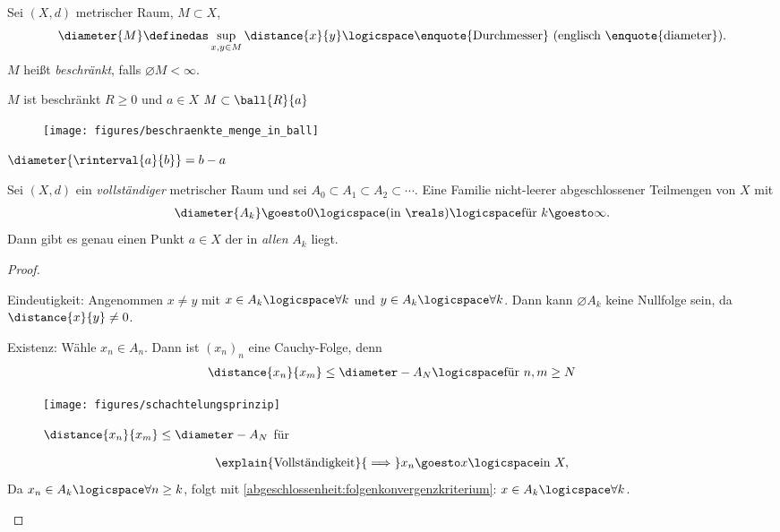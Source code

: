 \begin{definition}
    Sei \( (X,d)\) metrischer Raum, \( M\subset X\),
    \begin{align*}
        \diameter{M}\definedas \sup_{x,y\in M}\distance{x}{y}\logicspace \text{\enquote{Durchmesser} (englisch \enquote{diameter})}.
    \end{align*}
    \( M \) heißt \emph{beschränkt}, falls \( \diameter{M}<\infty \).
\end{definition}
\begin{bemerkung*}
    \( M\) ist beschränkt \tiff \texists \( R\geq 0\)  und \( a\in X\) \sd \( M\subset \ball{R}{a}\) 
    \begin{figure}[H]
        \centering
        \texttt{[image: figures/beschraenkte\_menge\_in\_ball]}
        \label{fig:beschraenkte_menge_in_ball}
    \end{figure}   
\end{bemerkung*}
\begin{beispiel*}
    \( \diameter{\rinterval{a}{b}}=b-a\)
\end{beispiel*}
\begin{satz}[Schachtelungsprinzip]
    Sei \( (X,d)\) ein \emph{vollständiger} metrischer Raum und sei \( A_0\subset A_1\subset A_2\subset \cdots\).
    Eine Familie nicht-leerer abgeschlossener Teilmengen von \( X\) mit
    \begin{align*}
        \diameter{A_k}\goesto 0 \logicspace (\text{in }\reals)\logicspace \text{für } k\goesto \infty. 
    \end{align*} 
    Dann gibt es genau einen Punkt \( a\in X\) der in \emph{allen} \( A_k\) liegt.
\end{satz}
\begin{proof}
    \begin{proofdescription}
        \item[Eindeutigkeit:] Angenommen \texists \( x\neq y\)  mit \( x\in A_k \logicspace \forall k\)  und \( y\in A_k \logicspace \forall k\). Dann kann \( \diameter{A_k}\) keine Nullfolge sein, da \( \distance{x}{y}\neq 0\).
        \item[Existenz:] Wähle \( x_n\in A_n\). Dann ist \( (x_n)_n\)  eine Cauchy-Folge, denn
        \begin{align*}
            \distance{x_n}{x_m}\leq \diameter-{A_N} \logicspace \text{für }n,m\geq N 
        \end{align*} 
        \begin{figure}[H]
            \centering
            \texttt{[image: figures/schachtelungsprinzip]}
            \caption*{\( \distance{x_n}{x_m}\leq \diameter-{A_N}\) für \( \)    }
            \label{fig:schachtelungsprinzip}
        \end{figure}
        \begin{align*}
            \explain{\text{Vollständigkeit}}{\implies}x_n \goesto x \logicspace \text{in } X,
        \end{align*}
        Da \( x_n\in A_k\logicspace \forall n\geq k\), folgt mit \ref{abgeschlossenheit:folgenkonvergenzkriterium}: \( x\in A_k\logicspace \forall k\). 
    \end{proofdescription}
\end{proof}
